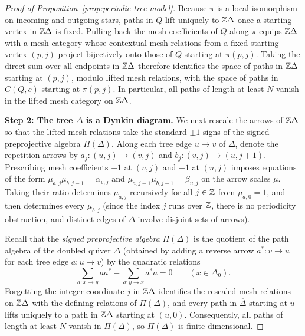 \begin{proof}[Proof of Proposition~\ref{prop:periodic-tree-model}]
Because $\pi$ is a local isomorphism on incoming and outgoing stars, paths in $Q$ lift uniquely to $\mathbb Z\Delta$ once a starting vertex in $\mathbb Z\Delta$ is fixed. Pulling back the mesh coefficients of $Q$ along $\pi$ equips $\mathbb Z\Delta$ with a mesh category whose contextual mesh relations from a fixed starting vertex $(p,j)$ project bijectively onto those of $Q$ starting at $\pi(p,j)$. Taking the direct sum over all endpoints in $\mathbb Z\Delta$ therefore identifies the space of paths in $\mathbb Z\Delta$ starting at $(p,j)$, modulo lifted mesh relations, with the space of paths in $C(Q,c)$ starting at $\pi(p,j)$. In particular, all paths of length at least $N$ vanish in the lifted mesh category on $\mathbb Z\Delta$.

\medskip
\noindent\textbf{Step 2: The tree $\Delta$ is a Dynkin diagram.}
We next rescale the arrows of $\mathbb Z\Delta$ so that the lifted mesh relations take the standard $\pm1$ signs of the signed preprojective algebra $\Pi(\Delta)$. Along each tree edge $u\to v$ of $\Delta$, denote the repetition arrows by $a_j\colon(u,j)\to(v,j)$ and $b_j\colon(v,j)\to(u,j+1)$. Prescribing mesh coefficients $+1$ at $(v,j)$ and $-1$ at $(u,j)$ imposes equations of the form $\mu_{a,j}\mu_{b,j-1}=\alpha_{v,j}$ and $\mu_{a,j-1}\mu_{b,j-1}=\beta_{u,j}$ on the arrow scales $\mu$. Taking their ratio determines $\mu_{a,j}$ recursively for all $j\in\mathbb Z$ from $\mu_{a,0}=1$, and then determines every $\mu_{b,j}$ (since the index $j$ runs over $\mathbb Z$, there is no periodicity obstruction, and distinct edges of $\Delta$ involve disjoint sets of arrows).

Recall that the \emph{signed preprojective algebra} $\Pi(\Delta)$ is the quotient of the path algebra of the doubled quiver $\overline\Delta$ (obtained by adding a reverse arrow $a^*\colon v\to u$ for each tree edge $a\colon u\to v$) by the quadratic relations
\[
  \sum_{a:x\to y}aa^*-\sum_{a:y\to x}a^*a=0\qquad(x\in\Delta_0).
\]
Forgetting the integer coordinate $j$ in $\mathbb Z\Delta$ identifies the rescaled mesh relations on $\mathbb Z\Delta$ with the defining relations of $\Pi(\Delta)$, and every path in $\overline\Delta$ starting at $u$ lifts uniquely to a path in $\mathbb Z\Delta$ starting at $(u,0)$. Consequently, all paths of length at least $N$ vanish in $\Pi(\Delta)$, so $\Pi(\Delta)$ is finite-dimensional.


\end{proof}

